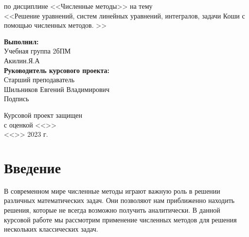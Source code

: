 \documentclass[12pt]{article}
\begin{document}
\begin{titlepage}
\begin{center}
            по дисциплине <<Численные методы>>
            на тему\\
            <<Решение уравнений, систем линейных уравнений, интегралов, задачи Коши с помощью численных методов. >>
        \end{center}

        \hfill \begin{minipage}{0.5\linewidth}
                   \textbf{Выполнил:}\\
                   Учебная группа 2бПМ\\
                   Акилин.Я.А\\
                   \textbf{Руководитель курсового проекта:
                   }\\
                   Старший преподаватель\\
                   Шильников Евгений Владимирович\\
                   Подпись \underline{\hspace{1cm}}\\
        \end{minipage}
        \vspace{1 cm}
        \begin{minipage}{0.45\linewidth}
            Курсовой проект защищен\\ с оценкой <<\underline{\hspace{1cm}}>>\\
            <<\underline{\hspace{0.7cm}}>> \underline{\hspace{2cm}} 2023 г.
        \end{minipage}
        \begin{minipage}{0.55\linewidth}
        \end{minipage}
        \vspace{5 cm}
    \end{titlepage}

    \tableofcontents
    \newpage


    \section{Введение}
    В современном мире численные методы играют важную роль в решении различных математических задач. Они позволяют нам приближенно находить решения, которые не всегда возможно получить аналитически. В данной курсовой работе мы рассмотрим применение численных методов для решения нескольких классических задач.
\end{document}
